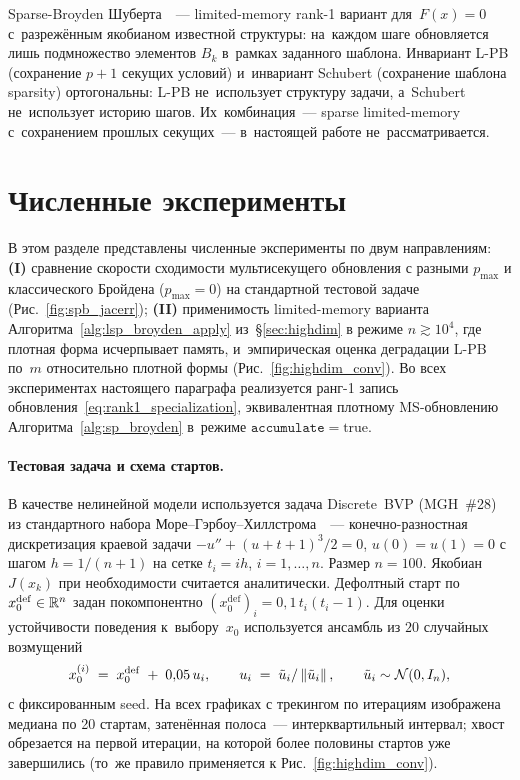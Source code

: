\begin{remark}\label{rem:lpb_vs_schubert}
Sparse-Broyden Шуберта~\cite{schubert1970}~--- limited-memory rank-1 вариант
для~$F(x)=0$ с~разрежённым якобианом известной структуры: на~каждом шаге
обновляется лишь подмножество элементов $B_k$ в~рамках заданного
шаблона. Инвариант L-PB (сохранение $p+1$ секущих условий) и~инвариант
Schubert (сохранение шаблона sparsity) ортогональны: L-PB не~использует
структуру задачи, а~Schubert не~использует историю шагов. Их~комбинация~---
sparse limited-memory с~сохранением прошлых секущих~--- в~настоящей работе
не~рассматривается.
\end{remark}


\section{Численные эксперименты}\label{sec:spb_numerics}

В этом разделе представлены численные эксперименты по двум направлениям:
\textbf{(I)} сравнение скорости сходимости мультисекущего обновления с
разными $p_{\max}$ и классического Бройдена ($p_{\max}=0$) на стандартной
тестовой задаче (Рис.~\ref{fig:spb_jacerr});
\textbf{(II)} применимость limited-memory варианта
Алгоритма~\ref{alg:lsp_broyden_apply} из~\S\ref{sec:highdim} в режиме
$n\gtrsim 10^4$, где плотная форма исчерпывает память, и~эмпирическая
оценка деградации L-PB по~$m$ относительно плотной формы
(Рис.~\ref{fig:highdim_conv}). Во всех экспериментах настоящего параграфа
реализуется ранг-1 запись обновления~\eqref{eq:rank1_specialization},
эквивалентная плотному MS-обновлению Алгоритма~\ref{alg:sp_broyden}
в~режиме $\mathtt{accumulate}=\text{true}$.

\paragraph{Тестовая задача и схема стартов.}\label{par:bvp-setup}
В качестве нелинейной модели используется задача Discrete~BVP (MGH~\#28) из
стандартного набора Море--Гэрбоу--Хиллстрома~\cite{more1981}~--- конечно-разностная
дискретизация краевой задачи $-u'' + (u+t+1)^3/2 = 0$, $u(0)=u(1)=0$
с шагом $h=1/(n+1)$ на сетке $t_i=ih$, $i=1,\ldots,n$. Размер $n=100$.
Якобиан $J(x_k)$ при необходимости считается аналитически. Дефолтный
старт по~\cite{more1981} $x_0^{\mathrm{def}}\in\mathbb{R}^n$ задан
покомпонентно $(x_0^{\mathrm{def}})_i = 0{,}1\,t_i(t_i-1)$. Для оценки
устойчивости поведения к~выбору~$x_0$ используется ансамбль из $20$
случайных возмущений
\[
  x_0^{(i)} \;=\; x_0^{\mathrm{def}} \;+\; 0{,}05\,u_i,
  \qquad
  u_i \;=\; \tilde u_i/\left\|\tilde u_i\right\|,
  \qquad
  \tilde u_i \sim \mathcal{N}(0, I_n),
\]
с фиксированным seed. На всех графиках с трекингом по итерациям
изображена медиана по 20 стартам, затенённая полоса~--- интерквартильный
интервал; хвост обрезается на первой итерации, на которой более
половины стартов уже завершились (то~же правило применяется к
Рис.~\ref{fig:highdim_conv}).

